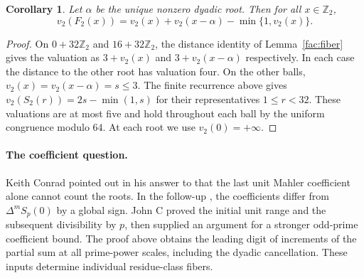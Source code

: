 \documentclass[11pt]{article}
\newtheorem{corollary}[theorem]{Corollary}
\theoremstyle{remark}\newtheorem{remark}[theorem]{Remark}
\begin{document}
\begin{corollary}\label{fac:twoformula}
Let $\alpha$ be the unique nonzero dyadic root. Then for all
$x\in\mathbb Z_2$,
\[
 v_2(F_2(x))=v_2(x)+v_2(x-\alpha)-\min\{1,v_2(x)\}.
\]
\end{corollary}
\begin{proof}
On $0+32\mathbb Z_2$ and $16+32\mathbb Z_2$, the distance identity
of Lemma~\ref{fac:fiber} gives the valuation as
$3+v_2(x)$ and $3+v_2(x-\alpha)$ respectively. In each case the
distance to the other root has valuation four. On the other balls,
$v_2(x)=v_2(x-\alpha)=s\le3$. The finite recurrence above gives
$v_2(S_2(r))=2s-\min(1,s)$ for their representatives $1\le r<32$.
These valuations are at most five and hold throughout each ball by
the uniform congruence modulo $64$. At each root we use
$v_2(0)=+\infty$.
\end{proof}

\paragraph{The coefficient question.}
Keith Conrad pointed out in his answer to \cite{John} that the last unit Mahler coefficient alone cannot count the roots. In the follow-up \cite{John2}, the coefficients differ from $\Delta^m S_p(0)$ by a global sign. John C proved the initial unit range and the subsequent divisibility by $p$, then supplied an argument for a stronger odd-prime coefficient bound. The proof above obtains the leading digit of increments of the partial sum at all prime-power scales, including the dyadic cancellation. These inputs determine individual residue-class fibers.
\end{document}
